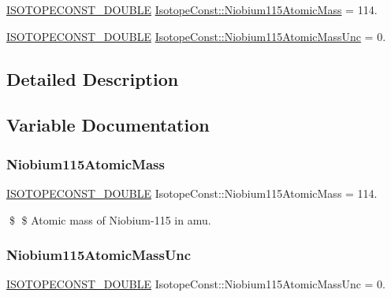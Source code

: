 \begin{DoxyCompactItemize}
\item 
\mbox{\hyperlink{group___isotope_const-_macros_ga8f45a7272ce02c0b4c65c44636ed719a}{I\+S\+O\+T\+O\+P\+E\+C\+O\+N\+S\+T\+\_\+\+D\+O\+U\+B\+LE}} \mbox{\hyperlink{group___isotope_const-_niobium-_nb115_ga58a436952d0b81c232256846f21270f2}{Isotope\+Const\+::\+Niobium115\+Atomic\+Mass}} = 114.
\item 
\mbox{\hyperlink{group___isotope_const-_macros_ga8f45a7272ce02c0b4c65c44636ed719a}{I\+S\+O\+T\+O\+P\+E\+C\+O\+N\+S\+T\+\_\+\+D\+O\+U\+B\+LE}} \mbox{\hyperlink{group___isotope_const-_niobium-_nb115_ga3e21085fee79205ccb9af6fd83b20978}{Isotope\+Const\+::\+Niobium115\+Atomic\+Mass\+Unc}} = 0.
\end{DoxyCompactItemize}


\subsection{Detailed Description}


\subsection{Variable Documentation}
\mbox{\label{group___isotope_const-_niobium-_nb115_ga58a436952d0b81c232256846f21270f2}} 
\subsubsection{\texorpdfstring{Niobium115\+Atomic\+Mass}{Niobium115AtomicMass}}
{\footnotesize\ttfamily \mbox{\hyperlink{group___isotope_const-_macros_ga8f45a7272ce02c0b4c65c44636ed719a}{I\+S\+O\+T\+O\+P\+E\+C\+O\+N\+S\+T\+\_\+\+D\+O\+U\+B\+LE}} Isotope\+Const\+::\+Niobium115\+Atomic\+Mass = 114.}

\$ \$ Atomic mass of Niobium-\/115 in amu. \mbox{\label{group___isotope_const-_niobium-_nb115_ga3e21085fee79205ccb9af6fd83b20978}} 
\subsubsection{\texorpdfstring{Niobium115\+Atomic\+Mass\+Unc}{Niobium115AtomicMassUnc}}
{\footnotesize\ttfamily \mbox{\hyperlink{group___isotope_const-_macros_ga8f45a7272ce02c0b4c65c44636ed719a}{I\+S\+O\+T\+O\+P\+E\+C\+O\+N\+S\+T\+\_\+\+D\+O\+U\+B\+LE}} Isotope\+Const\+::\+Niobium115\+Atomic\+Mass\+Unc = 0.}

